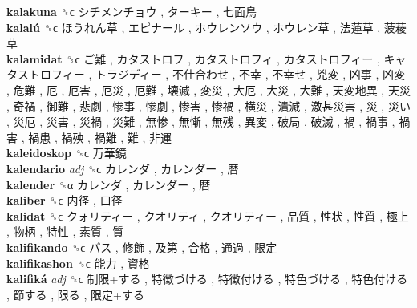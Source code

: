 \textbf{kalakuna} ␝ϲ   シチメンチョウ ,  ターキー ,  七面鳥   \\
\textbf{kalalú} ␝ϲ   ほうれん草 ,  エピナール ,  ホウレンソウ ,  ホウレン草 ,  法蓮草 ,  菠薐草   \\
\textbf{kalamidat} ␝ϲ   ご難 ,  カタストロフ ,  カタストロフィ ,  カタストロフィー ,  キャタストロフィー ,  トラジディー ,  不仕合わせ ,  不幸 ,  不幸せ ,  兇変 ,  凶事 ,  凶変 ,  危難 ,  厄 ,  厄害 ,  厄災 ,  厄難 ,  壊滅 ,  変災 ,  大厄 ,  大災 ,  大難 ,  天変地異 ,  天災 ,  奇禍 ,  御難 ,  悲劇 ,  惨事 ,  惨劇 ,  惨害 ,  惨禍 ,  横災 ,  潰滅 ,  激甚災害 ,  災 ,  災い ,  災厄 ,  災害 ,  災禍 ,  災難 ,  無惨 ,  無慚 ,  無残 ,  異変 ,  破局 ,  破滅 ,  禍 ,  禍事 ,  禍害 ,  禍患 ,  禍殃 ,  禍難 ,  難 ,  非運   \\
\textbf{kaleidoskop} ␝ϲ   万華鏡   \\
\textbf{kalendario} \emph{adj}  ␝ϲ   カレンダ ,  カレンダー ,  暦   \\
\textbf{kalender} ␝α   カレンダ ,  カレンダー ,  暦   \\
\textbf{kaliber} ␝ϲ   内径 ,  口径   \\
\textbf{kalidat} ␝ϲ   クォリティー ,  クオリティ ,  クオリティー ,  品質 ,  性状 ,  性質 ,  極上 ,  物柄 ,  特性 ,  素質 ,  質   \\
\textbf{kalifikando} ␝ϲ   パス ,  修飾 ,  及第 ,  合格 ,  通過 ,  限定   \\
\textbf{kalifikashon} ␝ϲ   能力 ,  資格   \\
\textbf{kalifiká} \emph{adj}  ␝ϲ   制限+する ,  特徴づける ,  特徴付ける ,  特色づける ,  特色付ける ,  節する ,  限る ,  限定+する   \\
